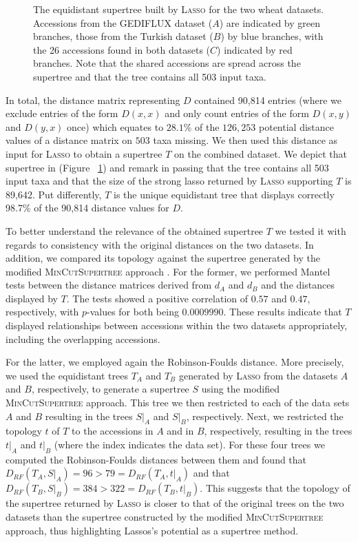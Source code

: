 \begin{figure}
  \centering {}
  \caption{The equidistant supertree built by \textsc{Lasso} for the two wheat
    datasets. Accessions from the GEDIFLUX dataset ($A$) are indicated by
    green branches, those from the Turkish dataset ($B$) by blue branches,
    with the 26 accessions found in both datasets ($C$) indicated by red
    branches. Note that the shared accessions are spread across the supertree
    and that the tree contains all 503 input taxa.}
  \label{fig:wheat-supertree}
\end{figure}

In total, the distance matrix representing $D$ contained 90,814 entries (where
we exclude entries of the form $D(x,x)$ and only count entries of the form
$D(x,y)$ and $D(y,x)$ once) which equates to $28.1\%$ of the $126,253$
potential distance values of a distance matrix on $503$ taxa missing.  We then
used this distance as input for \textsc{Lasso} to obtain a supertree $T$ on
the combined dataset. We depict that supertree in (Figure~
\ref{fig:wheat-supertree}) and remark in passing that the tree contains all
503 input taxa and that the size of the strong lasso returned by
\textsc{Lasso} supporting $T$ is 89,642. Put differently, $T$ is the unique
equidistant tree that displays correctly 98.7\% of the 90,814 distance values
for $D$.

To better understand the relevance of the obtained supertree $T$ we tested it
with regards to consistency with the original distances on the two
datasets. In addition, we compared its topology against the supertree
generated by the modified \textsc{MinCutSupertree} approach
\cite{page02mincut}.  For the former, we performed Mantel tests between the
distance matrices derived from $d_A$ and $d_B$ and the distances displayed by
$T$.  The tests showed a positive correlation of $0.57$ and $0.47$,
respectively, with $p$-values for both being $0.0009990$. These results
indicate that $T$ displayed relationships between accessions within the two
datasets appropriately, including the overlapping accessions.

For the latter, we employed again the Robinson-Foulds distance. More
precisely, we used the equidistant trees $T_A$ and $T_B$ generated by
\textsc{Lasso} from the datasets $A$ and $B$, respectively, to generate a
supertree $S$ using the modified \textsc{MinCutSupertree} approach. This tree
we then restricted to each of the data sets $A$ and $B$ resulting in the trees
$S|_A$ and $S|_B$, respectively. Next, we restricted the topology $t$ of $T$
to the accessions in $A$ and in $B$, respectively, resulting in the trees
$t|_A$ and $t|_B$ (where the index indicates the data set). For these four
trees we computed the Robinson-Foulds distances between them and found that
$D_{RF}(T_A,S|_A)= 96>79= D_{RF}(T_A,t|_A)$ and that $D_{RF}(T_B,S|_B)=
384>322=D_{RF}(T_B,t|_B)$.  This suggests that the topology of the supertree
returned by \textsc{Lasso} is closer to that of the original trees on the two
datasets than the supertree constructed by the modified
\textsc{MinCutSupertree} approach, thus highlighting {\sc Lassos}'s potential
as a supertree method.

